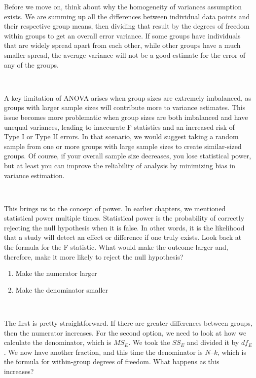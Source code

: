\documentclass[
  letterpaper,
  DIV=11,
  numbers=noendperiod]{scrreprt}
\begin{document}
Before we move on, think about why the homogeneity of variances
assumption exists. We are summing up all the differences between
individual data points and their respective group means, then dividing
that result by the degrees of freedom within groups to get an overall
error variance. If some groups have individuals that are widely spread
apart from each other, while other groups have a much smaller spread,
the average variance will not be a good estimate for the error of any of
the groups.\,\,

\,

A key limitation of ANOVA arises when group sizes are extremely
imbalanced, as groups with larger sample sizes will contribute more to
variance estimates. This issue becomes more problematic when group sizes
are both imbalanced and have unequal variances, leading to inaccurate F
statistics and an increased risk of Type I or Type II errors. In that
scenario, we would suggest taking a random sample from one or more
groups with large sample sizes to create similar-sized groups. Of
course, if your overall sample size decreases, you lose statistical
power, but at least you can improve the reliability of analysis by
minimizing bias in variance estimation.

\,

This brings us to the concept of power. In earlier chapters, we
mentioned statistical power multiple times. Statistical power is the
probability of correctly rejecting the null hypothesis when it is false.
In other words, it is the likelihood that a study will detect an effect
or difference if one truly exists. Look back at the formula for the F
statistic. What would make the outcome larger and, therefore, make it
more likely to reject the null hypothesis?\,\,

\begin{enumerate}
\def\labelenumi{\arabic{enumi}.}
\item
  Make the numerator larger\,
\item
  Make the denominator smaller\,
\end{enumerate}

\,

The first is pretty straightforward. If there are greater differences
between groups, then the numerator increases. For the second option, we
need to look at how we calculate the denominator, which is \(MS_E\). We
took the \(SS_E\) and divided it by \(df_E\). We now have another
fraction, and this time the denominator is \(N – k\), which is the
formula for within-group degrees of freedom. What happens as this
increases?\,\,
\end{document}
